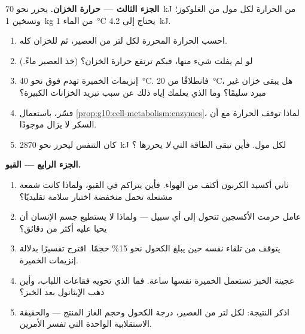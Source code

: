 \begin{problem}
\medskip
\noindent\textbf{الجزء الثالث --- حرارة الخزان.}
يحرر  نحو \qty{70}{kJ} من الحرارة لكل مول من الغلوكوز؛ وتسخين
\qty{1}{kg} من الماء \qty{1}{\celsius} يحتاج إلى \qty{4.2}{kJ}.
\begin{enumerate}[resume]
  \item احسب الحرارة المحررة لكل لتر من العصير، ثم للخزان كله.
  \item لو لم يفلت شيء منها، فبكم ترتفع حرارة الخزان؟ (خذ العصير
        ماءً.)
  \item إنزيمات الخميرة تهدم فوق نحو \qty{40}{\celsius}. فانطلاقًا من
        \qty{20}{\celsius}، هل يبقى خزان غير مبرد سليمًا؟ وما الذي
        يعلمك إياه ذلك عن سبب تبريد الخزانات الكبيرة؟
  \item فسّر، باستعمال \cref{prop:g10:cell-metabolism:enzymes}، لماذا
        توقف الحرارة  مع أن السكر لا يزال موجودًا.
  \item كان التنفس ليحرر نحو \qty{2870}{kJ} لكل مول. فأين تبقى الطاقة
        التي \emph{لا} يحررها ؟
\end{enumerate}

\medskip
\noindent\textbf{الجزء الرابع --- القبو.}
\begin{enumerate}[resume]
  \item ثاني أكسيد الكربون أكثف من الهواء. فأين يتراكم في القبو،
        ولماذا كانت شمعة مشتعلة تحمل منخفضة اختبار سلامة تقليديًا؟
  \item {} عامل حرمت الأكسجين تتحول إلى أي سبيل --- ولماذا لا
        يستطيع جسم الإنسان أن يحيا عليه أكثر من دقائق؟
  \item يتوقف  من تلقاء نفسه حين يبلغ الكحول نحو 15\% حجمًا.
        اقترح تفسيرًا بدلالة إنزيمات الخميرة.
  \item عجينة الخبز تستعمل الخميرة نفسها ساعة. فما الذي تحويه فقاعات
        اللباب، وأين ذهب الإيثانول بعد الخبز؟
  \item اذكر النتيجة: لكل لتر من العصير، درجة الكحول وحجم الغاز
        المنتج --- والحقيقة الاستقلابية الواحدة التي تفسر الأمرين.
\end{enumerate}
\end{problem}
